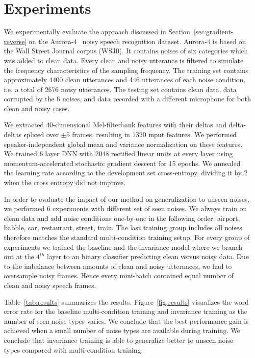 \documentclass{article}
\begin{document}
\section{Experiments}
\label{sec:experiments}
We experimentally evaluate the approach discussed in Section~\ref{sec:gradient-reverse} 
on the Aurora-4~\cite{parihar2002aurora} noisy speech recognition dataset. Aurora-4
is based on the Wall Street Journal corpus (WSJ0). It contains noises of 
six categories which was added to clean
data. Every clean and noisy utterance is filtered to simulate the frequency characteristics of the sampling frequency. 
%
The training
set contains approximately 4400 clean utterances and 446 utterances of each noise condition,
i.e. a total of 2676 noisy utterances.
The testing
set contains clean data, data corrupted by the 6 noises, and data recorded with a different microphone
for both clean and noisy cases.

We extracted 40-dimensional Mel-filterbank features with their deltas and 
delta-deltas spliced over $\pm$5 frames, resulting in 1320 input 
features. We performed speaker-independent global mean and variance normalization on these features. We trained 6 layer
DNN with 2048 rectified linear units at every layer using momentum-accelerated stochastic gradient descent for 15 epochs. We annealed the learning rate according 
to the development set cross-entropy, dividing it by 2 when the cross entropy did not improve.

In order to evaluate the impact of our method on generalization to unseen noises,
we performed 6 experiments with different set of seen noises. We always train
on clean data and add noise conditions one-by-one in the following order: airport, babble, car, 
restaurant, street, train. The last training group includes all noises therefore matches the
standard multi-condition training setup. For every group of experiments we trained the
baseline and the invariance model where we branch out at the $4^{th}$ layer to an  
binary classifier predicting clean versus noisy data. Due to the imbalance between amounts of clean and
noisy utterances, we had to oversample noisy frames. Hence every mini-batch contained
equal number of clean and noisy speech frames.

Table~\ref{tab:results} summarizes the results. Figure~\ref{fig:results} visualizes the word error rate for the baseline multi-condition training and invariance training as the number of seen noise types varies. We conclude that the best performance
gain is achieved when a small number of noise types are available during training. We conclude that invariance training is able to generalize better to unseen noise types compared with multi-condition training.
\end{document}
